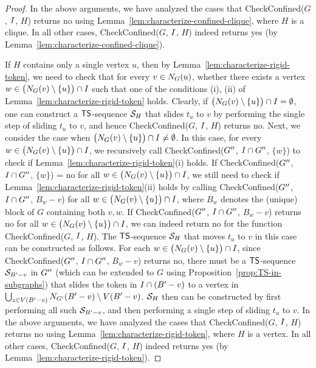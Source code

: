 \documentclass[a4paper]{llncs}
\begin{document}
\begin{proof}
In the above arguments, we have analyzed the cases that {\sc CheckConfined}($G$, $I$, $H$) returns {\sc no} using Lemma~\ref{lem:characterize-confined-clique}, where $H$ is a clique.
In all other cases, {\sc CheckConfined}($G$, $I$, $H$) indeed returns {\sc yes} (by Lemma~\ref{lem:characterize-confined-clique}).

If $H$ contains only a single vertex $u$, then by Lemma~\ref{lem:characterize-rigid-token}, we need to check that for every $v \in N_{G}(u)$, 
	whether there exists a vertex $w \in \big(N_{G}(v) \setminus \{u\}\big) \cap I$ such that 
	one of the conditions (i), (ii) of Lemma~\ref{lem:characterize-rigid-token} holds.
Clearly, if $\big( N_{G}(v) \setminus \{u\} \big) \cap I = \emptyset$, one can construct a ${\sf TS}$-sequence ${\cal S}_H$ that slides $t_u$ to $v$ by performing the single step of sliding $t_u$ to $v$, and hence {\sc CheckConfined}($G$, $I$, $H$) returns {\sc no}.
Next, we consider the case when  $\big( N_{G}(v) \setminus \{u\} \big) \cap I \neq \emptyset$.
In this case, for every $w \in  \big( N_{G}(v) \setminus \{u\} \big) \cap I$, we recursively call {\sc CheckConfined}($G^{\prime\prime}$, $I \cap G^{\prime\prime}$, $\{w\}$) to check if Lemma~\ref{lem:characterize-rigid-token}(i) holds.
If {\sc CheckConfined}($G^{\prime\prime}$, $I \cap G^{\prime\prime}$, $\{w\}$) = {\sc no} for all $w \in \big( N_{G}(v) \setminus \{u\} \big) \cap I$, we still need to check if Lemma~\ref{lem:characterize-rigid-token}(ii) holds by calling {\sc CheckConfined}($G^{\prime\prime}$, $I \cap G^{\prime\prime}$, $B_w - v$) for all $w \in \big( N_{G}(v) \setminus \{u\} \big) \cap I$, where $B_w$ denotes the (unique) block of $G$ containing both $v, w$.
If {\sc CheckConfined}($G^{\prime\prime}$, $I \cap G^{\prime\prime}$, $B_w - v$) returns {\sc no} for all $w \in \big( N_{G}(v) \setminus \{u\} \big) \cap I$, we can indeed return {\sc no} for the function {\sc CheckConfined}($G$, $I$, $H$).
The ${\sf TS}$-sequence ${\cal S}_H$ that moves $t_u$ to $v$ in this case can be constructed as follows.
For each $w \in \big( N_{G}(v) \setminus \{u\} \big) \cap I$, since {\sc CheckConfined}($G^{\prime\prime}$, $I \cap G^{\prime\prime}$, $B_w - v$) returns {\sc no}, there must be a ${\sf TS}$-sequence ${\cal S}_{B^{\prime} - v}$ in $G^{\prime\prime}$ (which can be extended to $G$ using Proposition~\ref{prop:TS-in-subgraphs}) that slides the token in $I \cap (B^{\prime} - v)$ to a vertex in $\bigcup_{z \in V(B^{\prime} - v)}N_{{G^\prime}}(B^{\prime} - v) \setminus V(B^{\prime} - v)$.
${\cal S}_H$ then can be constructed by first performing all such ${\cal S}_{B^{\prime} - v}$, and then performing a single step of sliding $t_u$ to $v$.
In the above arguments, we have analyzed the cases that {\sc CheckConfined}($G$, $I$, $H$) returns {\sc no} using Lemma~\ref{lem:characterize-rigid-token}, where $H$ is a vertex.
In all other cases, {\sc CheckConfined}($G$, $I$, $H$) indeed returns {\sc yes} (by Lemma~\ref{lem:characterize-rigid-token}).


\end{proof}
\end{document}
